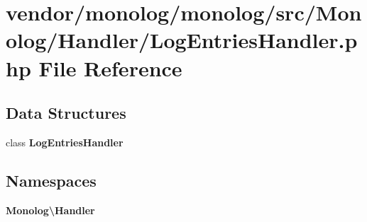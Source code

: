 \section{vendor/monolog/monolog/src/\+Monolog/\+Handler/\+Log\+Entries\+Handler.php File Reference}
\label{_log_entries_handler_8php}
\subsection*{Data Structures}
\begin{DoxyCompactItemize}
\item 
class {\bf Log\+Entries\+Handler}
\end{DoxyCompactItemize}
\subsection*{Namespaces}
\begin{DoxyCompactItemize}
\item 
 {\bf Monolog\textbackslash{}\+Handler}
\end{DoxyCompactItemize}
